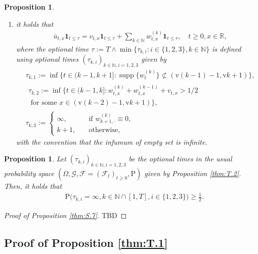 \documentclass[12pt,a4paper]{amsart}
\numberwithin{equation}{section}
\theoremstyle{plain}
\newtheorem{proposition}[theorem]{Proposition}
\theoremstyle{remark}
\begin{document}
\begin{proposition}
\begin{enumerate}
	\item it holds that
	\begin{align} 
	& \bar u_{t,x} \mathbf 1_{t\leq \tau} =  v_{t,x}\mathbf 1_{t\leq \tau} + \sum_{k\in \mathbb N}w^{(k)}_{t,x} \mathbf 1_{t\leq \tau}, \quad t\geq 0, x\in \mathbb R,
	\end{align}
	where the optional time $\tau:= T\wedge \min \{\tau_{k,i}: i \in \{1,2,3\}, k \in \mathbb N\}$ is defined using optional times $(\tau_{k,i})_{k\in \mathbb N, i = 1,2,3}$ given by
	\begin{align} 
	& \tau_{k,1} := \inf \{t \in (k-1,k+1]: \operatorname{supp} \{w^{(k)}_t\}\not \subset (\mathrm v(k-1) - 1, \mathrm vk + 1)\}, 
	\\& \begin{multlined}
	\tau_{k,2} := \inf \{t \in (k-1,k]:w^{(k)}_{t,x} + w^{(k-1)}_{t,x} + v_{t,x} > 1/2
	\\\text{ for some } x\in (\mathrm v(k-2)-1, \mathrm vk + 1)\},
	\end{multlined}
	\\& \tau_{k,3} := \begin{cases}
	\infty, &\quad \text{if } w^{(k)}_{k+1,\cdot} \equiv 0,
	\\ k+1, & \quad \text{otherwise},
	\end{cases}
	\end{align} 
	with the convention that the infumum of empty set is infinite.
\end{enumerate}
\end{proposition}

\begin{proposition}\label{thm:T.4}
	Let $(\tau_{k,i})_{k\in \mathbb N, i = 1,2,3}$ be the optional times in the usual probability space $(\Omega, \mathcal G, \mathcal F = (\mathcal F_t)_{t\geq 0}, \mathrm P)$ given by Proposition \ref{thm:T.2}.
	Then, it holds that
	\begin{align} 
	& \mathrm P \big( \tau_{k,i}= \infty, k \in \mathbb N \cap [1,T], i \in \{1,2,3\}\big) \geq \frac{1}{2}. 
	\end{align}	
\end{proposition}

\begin{proof}[Proof of Proposition \ref{thm:S.7}]
	\color{blue}
	TBD
\end{proof}

\subsection{Proof of Proposition \ref{thm:T.1}}
\end{document}
